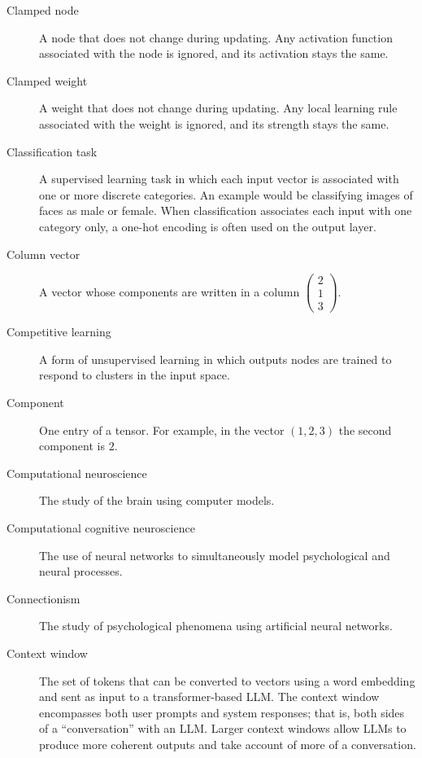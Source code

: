 \begin{description}
\item[Clamped node] A node that does not change during updating. Any activation function associated with the node is ignored, and its activation stays the same.

\item[Clamped weight] A weight that does not change during updating. Any local learning rule associated with the weight is ignored, and its strength stays the same.

\item[Classification task] A supervised learning task in which each input vector is associated with one or more discrete  categories. An example would be classifying images of faces as male or female. When classification associates each input with one category only, a one-hot encoding is often used on the output layer.

\item[Column vector] A vector whose components are written in a column \eg $\displaystyle \begin{pmatrix} 2 \\ 1 \\ 3 \end{pmatrix}$.

\item[Competitive learning] A form of unsupervised learning in which outputs nodes are trained to respond to clusters in the input space. 

\item[Component] One entry of a tensor. For example, in the vector $(1,2,3)$ the second component is $2$.

\item[Computational neuroscience] The study of the brain using computer models.

\item[Computational cognitive neuroscience] The use of neural networks to simultaneously model psychological and neural processes.

\item[Connectionism] The study of psychological phenomena using artificial neural networks.

\item[Context window] The set of tokens that can be converted to vectors using a word embedding and sent as input to a transformer-based LLM.  The context window encompasses both user prompts and system responses; that is, both sides of a ``conversation'' with an LLM. Larger context windows allow LLMs to produce more coherent outputs and take account of more of a conversation.


\end{description}
